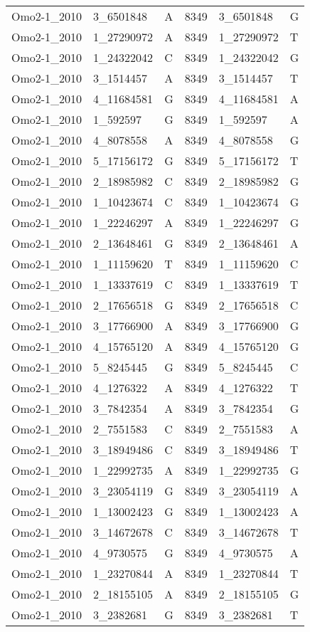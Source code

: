 \begin{center}
\begin{longtable}{|l|l|l|l|l|l|}
Omo2-1\_2010&3\_6501848&A&8349&3\_6501848&G\\
Omo2-1\_2010&1\_27290972&A&8349&1\_27290972&T\\
Omo2-1\_2010&1\_24322042&C&8349&1\_24322042&G\\
Omo2-1\_2010&3\_1514457&A&8349&3\_1514457&T\\
Omo2-1\_2010&4\_11684581&G&8349&4\_11684581&A\\
Omo2-1\_2010&1\_592597&G&8349&1\_592597&A\\
Omo2-1\_2010&4\_8078558&A&8349&4\_8078558&G\\
Omo2-1\_2010&5\_17156172&G&8349&5\_17156172&T\\
Omo2-1\_2010&2\_18985982&C&8349&2\_18985982&G\\
Omo2-1\_2010&1\_10423674&C&8349&1\_10423674&G\\
Omo2-1\_2010&1\_22246297&A&8349&1\_22246297&G\\
Omo2-1\_2010&2\_13648461&G&8349&2\_13648461&A\\
Omo2-1\_2010&1\_11159620&T&8349&1\_11159620&C\\
Omo2-1\_2010&1\_13337619&C&8349&1\_13337619&T\\
Omo2-1\_2010&2\_17656518&G&8349&2\_17656518&C\\
Omo2-1\_2010&3\_17766900&A&8349&3\_17766900&G\\
Omo2-1\_2010&4\_15765120&A&8349&4\_15765120&G\\
Omo2-1\_2010&5\_8245445&G&8349&5\_8245445&C\\
Omo2-1\_2010&4\_1276322&A&8349&4\_1276322&T\\
Omo2-1\_2010&3\_7842354&A&8349&3\_7842354&G\\
Omo2-1\_2010&2\_7551583&C&8349&2\_7551583&A\\
Omo2-1\_2010&3\_18949486&C&8349&3\_18949486&T\\
Omo2-1\_2010&1\_22992735&A&8349&1\_22992735&G\\
Omo2-1\_2010&3\_23054119&G&8349&3\_23054119&A\\
Omo2-1\_2010&1\_13002423&G&8349&1\_13002423&A\\
Omo2-1\_2010&3\_14672678&C&8349&3\_14672678&T\\
Omo2-1\_2010&4\_9730575&G&8349&4\_9730575&A\\
Omo2-1\_2010&1\_23270844&A&8349&1\_23270844&T\\
Omo2-1\_2010&2\_18155105&A&8349&2\_18155105&G\\
Omo2-1\_2010&3\_2382681&G&8349&3\_2382681&T\\

\end{longtable}
\end{center}
